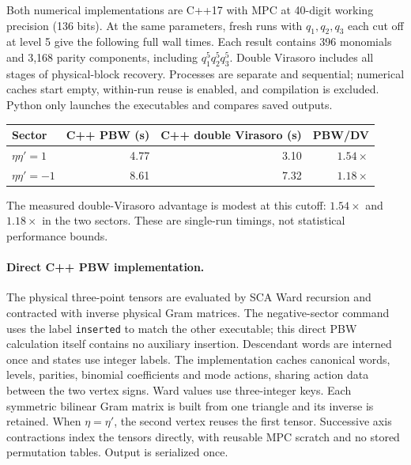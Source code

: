 Both numerical implementations are C++17 with MPC at 40-digit working
precision (136 bits). At the same parameters, fresh runs with
$q_1,q_2,q_3$ each cut off at level 5 give the following full wall times.
Each result contains 396 monomials and 3,168 parity components, including
$q_1^5q_2^5q_3^5$. Double Virasoro includes all stages of physical-block
recovery. Processes are separate and sequential; numerical caches start
empty, within-run reuse is enabled, and compilation is excluded.
Python only launches the executables and compares saved outputs.
\begin{center}\small
\begin{tabular}{@{}lrrr@{}}
\toprule
Sector & C++ PBW (s) & C++ double Virasoro (s) & PBW/DV\\
\midrule
$\eta\eta'=1$ & 4.77 & 3.10 & $1.54\times$\\
$\eta\eta'=-1$ & 8.61 & 7.32 & $1.18\times$\\
\bottomrule
\end{tabular}
\end{center}
The measured double-Virasoro advantage is modest at this cutoff:
$1.54\times$ and $1.18\times$ in the two sectors.
These are single-run timings, not statistical performance bounds.

\paragraph{Direct C++ PBW implementation.}
The physical three-point tensors are evaluated by SCA Ward recursion and
contracted with inverse physical Gram matrices. The negative-sector
command uses the label \texttt{inserted} to match the other executable;
this direct PBW calculation itself contains no auxiliary insertion.
Descendant words are interned once and states use integer labels.
The implementation caches canonical words, levels, parities, binomial
coefficients and mode actions, sharing action data between the two vertex
signs. Ward values use three-integer keys. Each symmetric bilinear Gram
matrix is built from one triangle and its inverse is retained. When
$\eta=\eta'$, the second vertex reuses the first tensor. Successive
axis contractions index the tensors directly, with reusable MPC scratch
and no stored permutation tables. Output is serialized once.

